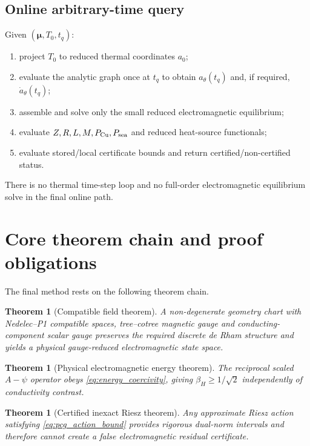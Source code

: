 \documentclass[11pt]{article}
\newtheorem{theorem}[assumption]{Theorem}
\theoremstyle{remark}
\newcommand{\mupar}{\boldsymbol\mu}
\begin{document}
\subsection{Online arbitrary-time query}
Given \((\mupar,T_0,t_q)\):
\begin{enumerate}
\item project \(T_0\) to reduced thermal coordinates \(a_0\);
\item evaluate the analytic graph once at \(t_q\) to obtain \(a_\theta(t_q)\) and, if required, \(\dot a_\theta(t_q)\);
\item assemble and solve only the small reduced electromagnetic equilibrium;
\item evaluate \(Z,R,L,M,P_{\rm Cu},P_{\rm sea}\) and reduced heat-source functionals;
\item evaluate stored/local certificate bounds and return certified/non-certified status.
\end{enumerate}
There is no thermal time-step loop and no full-order electromagnetic equilibrium solve in the final online path.

\section{Core theorem chain and proof obligations}

The final method rests on the following theorem chain.

\begin{theorem}[Compatible field theorem]
A non-degenerate geometry chart with Nedelec--P1 compatible spaces, tree--cotree magnetic gauge and conducting-component scalar gauge preserves the required discrete de Rham structure and yields a physical gauge-reduced electromagnetic state space.
\end{theorem}

\begin{theorem}[Physical electromagnetic energy theorem]
The reciprocal scaled \(A-\psi\) operator obeys \eqref{eq:energy_coercivity}, giving \(\beta_H\ge1/\sqrt2\) independently of conductivity contrast.
\end{theorem}

\begin{theorem}[Certified inexact Riesz theorem]
Any approximate Riesz action satisfying \eqref{eq:pcg_action_bound} provides rigorous dual-norm intervals and therefore cannot create a false electromagnetic residual certificate.
\end{theorem}
\end{document}

